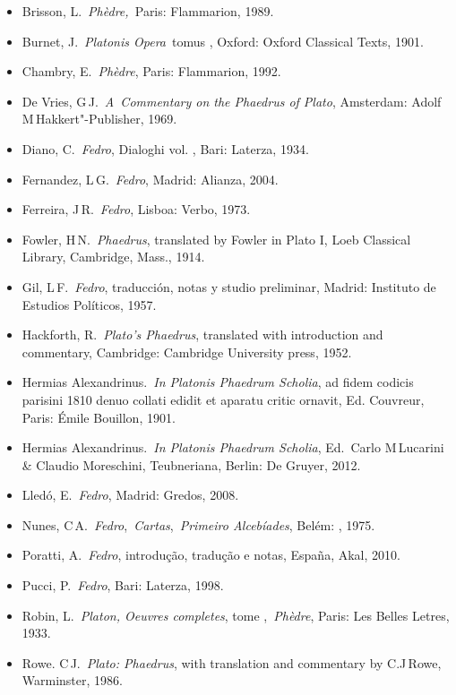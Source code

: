 {\begin{itemize}
\itemsep1pt\parskip0pt
\item
  Brisson, L.~\emph{Phèdre,~}Paris: Flammarion, 1989.
\item
  Burnet, J.~\emph{Platonis Opera}~tomus , Oxford: Oxford Classical
  Texts, 1901.
\item
  Chambry, E.~\emph{Phèdre}, Paris: Flammarion, 1992.
\item
  De Vries, G\,J.~\emph{A~Commentary on the Phaedrus of Plato},
  Amsterdam: Adolf M\,Hakkert"-Publisher, 1969.
\item
  Diano, C.~\emph{Fedro}, Dialoghi vol. , Bari: Laterza, 1934.
\item
  Fernandez, L\,G.~\emph{Fedro}, Madrid: Alianza, 2004.
\item
  Ferreira, J\,R.~\emph{Fedro}, Lisboa: Verbo, 1973.
\item
  Fowler, H\,N.~\emph{Phaedrus}, translated by Fowler in Plato I, Loeb
  Classical Library, Cambridge, Mass., 1914.
\item
  Gil, L\,F.~\emph{Fedro}, traducción, notas y studio preliminar,
  Madrid: Instituto de Estudios Políticos, 1957.
\item
  Hackforth, R.~\emph{Plato's Phaedrus}, translated with introduction
  and commentary, Cambridge: Cambridge University press, 1952.
\item
  Hermias Alexandrinus.~\emph{In Platonis Phaedrum Scholia}, ad fidem
  codicis parisini 1810 denuo collati edidit et aparatu critic ornavit,
  Ed. Couvreur, Paris: Émile Bouillon, 1901.
\item
  Hermias Alexandrinus.~\emph{In Platonis Phaedrum Scholia}, Ed.~Carlo
  M\,Lucarini \& Claudio Moreschini, Teubneriana, Berlin: De Gruyer,
  2012.
\item
  Lledó, E.~\emph{Fedro}, Madrid: Gredos, 2008.
\item
  Nunes, C\,A.~\emph{Fedro},~\emph{Cartas},~\emph{Primeiro Alcebíades},
  Belém: , 1975.
\item
  Poratti, A.~\emph{Fedro}, introdução, tradução e notas, España, Akal,
  2010.
\item
  Pucci, P.~\emph{Fedro}, Bari: Laterza, 1998.
\item
  Robin, L.~\emph{Platon, Oeuvres completes}, tome ,~\emph{Phèdre},
  Paris: Les Belles Letres, 1933.
\item
  Rowe. C\,J.~\emph{Plato: Phaedrus}, with translation and commentary by
  C.J\,Rowe, Warminster, 1986.

\end{itemize}}
